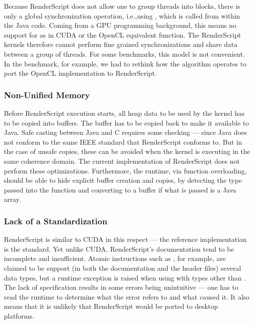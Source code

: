 Because RenderScript does not allow one to group threads into blocks, there is
only a global synchronization operation, i.e.,using ,  which is
called from within the Java code.  Coming from a GPU programming background,
this means no support for  as in CUDA or the OpenCL
equivalent  function.  The RenderScript kernels therefore cannot
perform fine grained synchronizations and share data between a group of threads.
For some benchmarks, this model is not convenient.  In the 
benchmark, for example, we had to rethink how the algorithm operates to port the
OpenCL implementation to RenderScript.


\subsubsection{Non-Unified Memory}

Before RenderScript execution starts, all heap data to be used by the kernel has
to be copied into  buffers.  The buffer has to be copied back to
make it available to Java.  Safe casting between Java and C requires some
checking --- since Java does not conform to the same IEEE standard that
RenderScript conforms to.  But in the case of unsafe copies, these can be
avoided when the kernel is executing in the same coherence domain.  The current
implementation of RenderScript does not perform these optimizations.
Furthermore, the runtime, via function overloading, should be able to hide
explicit buffer creation and copies, by detecting the type passed into the
function and converting to a  buffer if what is passed is a Java
array.

\subsubsection{Lack of a Standardization}

RenderScript is similar to CUDA in this respect --- the reference implementation
  is the standard.
Yet unlike CUDA, RenderScript's documentation tend to be incomplete and insufficient.
Atomic instructions such as , for example, are claimed to be support 
(in both the documentation and the header files) several data types, but a 
runtime exception is raised when using with types other than .
The lack of specification results in some errors being unintuitive --- one has to 
  read the runtime to determine what the error refers to and what caused it.
It also means that it is unlikely that RenderScript would be 
  ported to desktop platforms.


